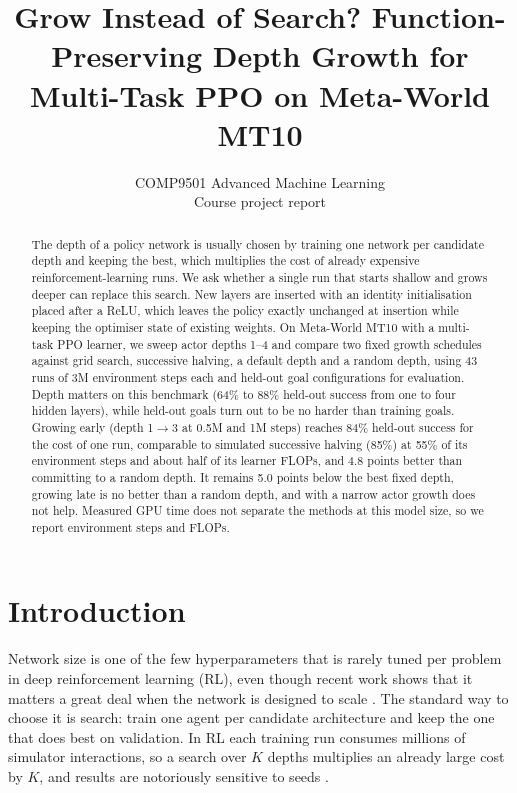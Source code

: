 \documentclass{article}
\title{Grow Instead of Search? Function-Preserving Depth Growth for Multi-Task PPO on Meta-World MT10}
\author{%
  COMP9501 Advanced Machine Learning \\
  Course project report \\
}
\begin{document}
\maketitle

\begin{abstract}
The depth of a policy network is usually chosen by training one network per candidate depth and keeping the best, which multiplies the cost of already expensive reinforcement-learning runs.
We ask whether a single run that starts shallow and grows deeper can replace this search.
New layers are inserted with an identity initialisation placed after a ReLU, which leaves the policy exactly unchanged at insertion while keeping the optimiser state of existing weights.
On Meta-World MT10 with a multi-task PPO learner, we sweep actor depths 1--4 and compare two fixed growth schedules against grid search, successive halving, a default depth and a random depth, using 43 runs of 3M environment steps each and held-out goal configurations for evaluation.
Depth matters on this benchmark (64\% to 88\% held-out success from one to four hidden layers), while held-out goals turn out to be no harder than training goals.
Growing early (depth 1$\to$3 at 0.5M and 1M steps) reaches 84\% held-out success for the cost of one run, comparable to simulated successive halving (85\%) at 55\% of its environment steps and about half of its learner FLOPs, and 4.8 points better than committing to a random depth.
It remains 5.0 points below the best fixed depth, growing late is no better than a random depth, and with a narrow actor growth does not help.
Measured GPU time does not separate the methods at this model size, so we report environment steps and FLOPs.
\end{abstract}

\section{Introduction}

Network size is one of the few hyperparameters that is rarely tuned per problem in deep reinforcement learning (RL), even though recent work shows that it matters a great deal when the network is designed to scale \citep{nauman2024bro,lee2025simba}.
The standard way to choose it is search: train one agent per candidate architecture and keep the one that does best on validation.
In RL each training run consumes millions of simulator interactions, so a search over $K$ depths multiplies an already large cost by $K$, and results are notoriously sensitive to seeds \citep{henderson2018matters}.
\end{document}
